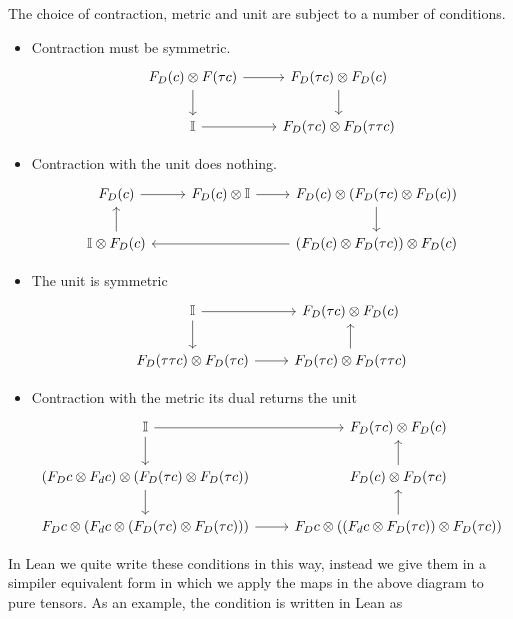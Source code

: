 \documentclass[a4paper, 11pt]{article}
\begin{document}
The choice of contraction, metric and unit are subject to a number of conditions.
\begin{itemize}
\item Contraction must be symmetric.
\begin{equation}
  \begin{tikzcd}
    F_D(c) \otimes F(\tau c) \arrow[r] \arrow[d] & F_D(\tau c) \otimes F_D (c) \arrow[d] \\
    \mathbb{I} \arrow[r] & F_D(\tau c) \otimes F_D (\tau \tau c)
  \end{tikzcd}
  \end{equation}
  \item Contraction with the unit does nothing. 
  \begin{equation}
    \begin{tikzcd}
      F_D(c) \arrow[r] &  F_D(c) \otimes \mathbb{I} \arrow[r] & F_D(c) \otimes (F_D (\tau c) \otimes F_D(c)) \arrow[d] \\
      \mathbb{I} \otimes F_D(c) \arrow[u] &   &(F_D(c) \otimes F_D(\tau c)) \otimes F_D(c) \arrow[ll] 
  \end{tikzcd}
  \end{equation}
  \item The unit is symmetric 
  \begin{equation} 
    \begin{tikzcd}
      \mathbb{I} \arrow[r] \arrow[d] & F_D(\tau c) \otimes F_D(c) \\
      F_D(\tau \tau c) \otimes F_D(\tau c) \arrow[r] & F_D(\tau c) \otimes F_D(\tau \tau c) \arrow[u]
    \end{tikzcd}
  \end{equation}
  \item Contraction with the metric its dual returns the unit
  \begin{equation}
    \begin{tikzcd}
      \mathbb{I} \arrow[r] \arrow[d] & F_D(\tau c) \otimes F_D (c) \\ 
      (F_D c \otimes F_d c) \otimes (F_D (\tau c) \otimes F_D (\tau c) ) \arrow [d]  & F_D (c) \otimes F_D(\tau c) \arrow[u] \\ 
      F_D c \otimes (F_d c \otimes (F_D (\tau c) \otimes F_D (\tau c) )) \arrow [r] &  F_D c \otimes ((F_d c \otimes F_D (\tau c)) \otimes F_D (\tau c) ) \arrow[u]
    \end{tikzcd}
  \end{equation}
\end{itemize}
In Lean we quite write these conditions in this way, instead we give them in a simpiler equivalent form 
in which we apply the maps in the above diagram to pure tensors. As an example, 
the condition is written in Lean as 
\end{document}
